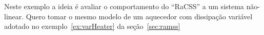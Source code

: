 \begin{exmp}
  Neste exemplo a ideia é avaliar o comportamento do ``RaCSS'' a um sistema não-linear. Quero tomar o mesmo modelo de um aquecedor com dissipação variável adotado no exemplo~\ref{ex:varHeater} da seção~\ref{sec:ramss}


\end{exmp}

